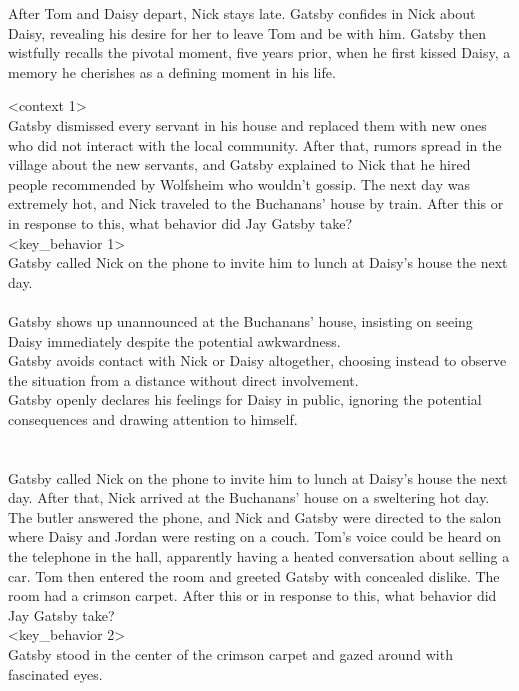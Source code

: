 \begin{tcolorbox}[title = {History}, breakable]
After Tom and Daisy depart, Nick stays late. Gatsby confides in Nick about Daisy, revealing his desire for her to leave Tom and be with him. Gatsby then wistfully recalls the pivotal moment, five years prior, when he first kissed Daisy, a memory he cherishes as a defining moment in his life.

\end{tcolorbox}

\begin{tcolorbox}[title = {Behavior Chain}, breakable]
<context 1>\\
Gatsby dismissed every servant in his house and replaced them with new ones who did not interact with the local community. After that, rumors spread in the village about the new servants, and Gatsby explained to Nick that he hired people recommended by Wolfsheim who wouldn't gossip. The next day was extremely hot, and Nick traveled to the Buchanans' house by train. After this or in response to this, what behavior did Jay Gatsby take?
\\<key\_behavior 1>\\
Gatsby called Nick on the phone to invite him to lunch at Daisy's house the next day.
\\<distracters 1>\\
Gatsby shows up unannounced at the Buchanans' house, insisting on seeing Daisy immediately despite the potential awkwardness.\\
Gatsby avoids contact with Nick or Daisy altogether, choosing instead to observe the situation from a distance without direct involvement.\\
Gatsby openly declares his feelings for Daisy in public, ignoring the potential consequences and drawing attention to himself.\\
\\<context 2>\\
Gatsby called Nick on the phone to invite him to lunch at Daisy's house the next day. After that, Nick arrived at the Buchanans' house on a sweltering hot day. The butler answered the phone, and Nick and Gatsby were directed to the salon where Daisy and Jordan were resting on a couch. Tom's voice could be heard on the telephone in the hall, apparently having a heated conversation about selling a car. Tom then entered the room and greeted Gatsby with concealed dislike. The room had a crimson carpet. After this or in response to this, what behavior did Jay Gatsby take?
\\<key\_behavior 2>\\
Gatsby stood in the center of the crimson carpet and gazed around with fascinated eyes.

\end{tcolorbox}
